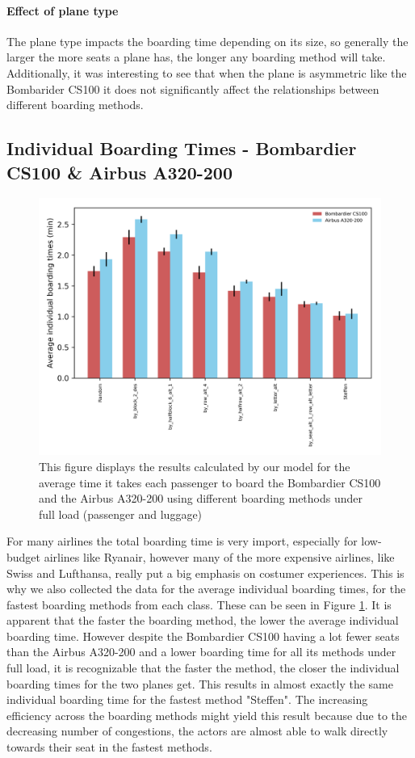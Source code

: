 \documentclass[11pt]{article}
\begin{document}
 \paragraph{Effect of plane type}
 The plane type impacts the boarding time depending on its size, so generally the larger the more seats a plane has, the longer any boarding method will take. Additionally, it was interesting to see that when the plane is asymmetric like the Bombarider CS100 it does not significantly affect the relationships between different boarding methods.
 
 \subsection{Individual Boarding Times - Bombardier CS100 \& Airbus A320-200}
	\begin{figure}
		\includegraphics[width=\linewidth]{../../code/AirplaneBoarding/data/figure3/figure3.png}
		\caption{This figure displays the results calculated by our model for the average time it takes each passenger to board the Bombardier CS100 and the Airbus A320-200 using different boarding methods under full load (passenger and luggage)}
		\label{figure3}
	\end{figure}
	For many airlines the total boarding time is very import, especially for low-budget airlines like Ryanair, however many of the more expensive airlines, like Swiss and Lufthansa, really put a big emphasis on costumer experiences. This is why we also collected the data for the average individual boarding times, for the fastest boarding methods from each class. These can be seen in Figure \ref{figure3}. It is apparent that the faster the boarding method, the lower the average individual boarding time. However despite the Bombardier CS100 having a lot fewer seats than the Airbus A320-200 and a lower boarding time for all its methods under full load, it is recognizable that the faster the method, the closer the individual boarding times for the two planes get. This results in almost exactly the same individual boarding time for the fastest method "Steffen". The increasing efficiency across the boarding methods might yield this result because due to the decreasing number of congestions, the actors are almost able to walk directly towards their seat in the fastest methods.
	
\end{document}
